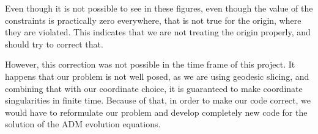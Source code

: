 Even though it is not possible to see in these figures, even though the value of the constraints is practically zero everywhere, that is not true for the origin, where they are violated. This indicates that we are not treating the origin properly, and should try to correct that.

However, this correction was not possible in the time frame of this project. It happens that our problem is not well posed, as we are using geodesic slicing, and combining that with our coordinate choice, it is guaranteed to make coordinate singularities in finite time. Because of that, in order to make our code correct, we would have to reformulate our problem and develop completely new code for the solution of the ADM evolution equations.